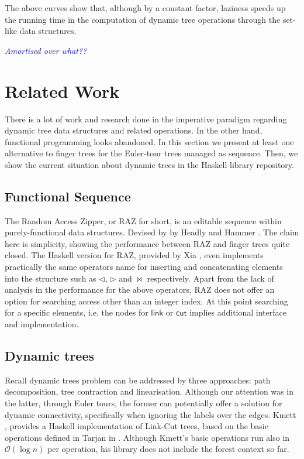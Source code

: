 \documentclass{elsarticle}
\newcommand{\tcb} [1]{\emph{\textcolor{blue}{#1}}}
\newcommand{\MATHSF}[1]{\ensuremath{\mathsf{#1}}\xspace}
\newcommand{\link}{\MATHSF{link}}
\newcommand{\cut}{\MATHSF{cut}}
\renewcommand{\O}{\ensuremath{\mathcal{O}}}
\begin{document}
The above curves show that, although by a constant factor, laziness speeds up the running time in the computation of dynamic tree operations through the set-like data structures.

\tcb{Amortised over what??}



\section{Related Work} 
\label{sec:RelWrk} 

There is a lot of work and research done in the imperative paradigm regarding dynamic tree data structures and related operations. In the other hand, functional programming looks abandoned. In this section we present at least one alternative to finger trees for the Euler-tour trees managed as sequence. Then, we show the current situation about dynamic trees in the Haskell library repository.

\subsection{Functional Sequence}
The Random Access Zipper, or RAZ for short, is an editable sequence within purely-functional data structures. Devised by by Headly and Hammer \cite{RAZ}. The claim here is simplicity, showing the performance between RAZ and finger trees quite closed. The Haskell version for RAZ, provided by Xia \cite{HaskellRAZ}, even implements practically the same operators name for inserting and concatenating elements into the structure such as $\lhd$, $\rhd$ and $\bowtie$ respectively. Apart from the lack of analysis in the performance for the above operators, RAZ does not offer an option for searching access other than an integer index. At this point searching for a specific elements, i.e. the nodes for \link or \cut implies additional interface and implementation.

\subsection{Dynamic trees}

Recall dynamic trees problem can be addressed by three approaches: path decomposition, tree contraction and linearisation. Although our attention was in the latter, through Euler tours, the former can potentially offer a solution for dynamic connectivity, specifically when ignoring the labels over the edges. Kmett \cite{HaskellLC}, provides a Haskell implementation of Link-Cut trees, based on the basic operations defined in Tarjan in \cite{LittleBook}. Although Kmett's basic operations run also in $\O(\log n)$ per operation, his library does not include the forest context so far. 
\end{document}
